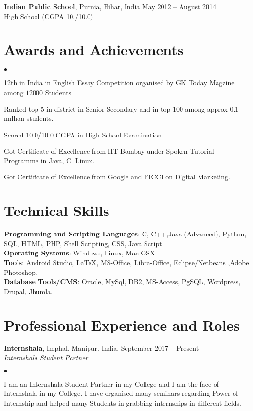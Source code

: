 \documentclass[margin,line]{res}
\newenvironment{list2}{
  \begin{list}{$\bullet$}{%
      \setlength{\itemsep}{0in}
      \setlength{\parsep}{0in} \setlength{\parskip}{0in}
      \setlength{\topsep}{0in} \setlength{\partopsep}{0in}
      \setlength{\leftmargin}{0.2in}}}{\end{list}}
\begin{document}
\begin{resume}
{\bf Indian Public School}, Purnia, Bihar, India \hfill 
May 2012 -- August 2014\\
High School \hfill(CGPA 10./10.0)

\section{\sc Awards and Achievements}
\begin{list2}
\item 12th in India in English Essay Competition organised by GK Today Magzine among $12000$ Students\\
\item Ranked top 5 in district in Senior Secondary and in top 100 among approx 0.1 million students.
\item Scored 10.0/10.0 CGPA in High School Examination.
\item Got Certificate of Excellence from IIT Bombay under Spoken Tutorial Programme in Java, C, Linux.
\item Got Certificate of Excellence from Google and FICCI on Digital Marketing.

\end{list2}

\section{\sc Technical Skills}
{\bf Programming and Scripting Languages}:  C, C++,Java (Advanced), Python, SQL, HTML, PHP, Shell Scripting, CSS, Java Script. \\
{\bf Operating Systems}: Windows, Linux, Mac OSX\\
{\bf Tools}: Android Studio, \LaTeX, MS-Office, Libra-Office, Eclipse/Netbeans ,Adobe Photoshop. \\
{\bf Database Tools/CMS}: Oracle, MySql, DB2, MS-Access, PgSQL, Wordpress, Drupal, Jhumla.
 
\section{\sc Professional Experience and Roles}
{\bf Internshala}, Imphal, Manipur. India. \hfill{September 2017 -- Present}\\
{\em Internshala Student Partner}
\begin{list2} %
\item I am an Internshala Student Partner in my College and I am the face of Internshala in my College. I have organised many seminars regarding Power of Internship and helped many Students in grabbing internships in different fields. \\


\end{list2}
\end{resume}
\end{document}
